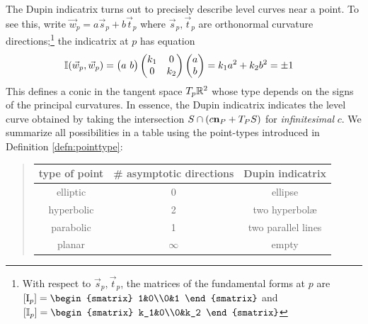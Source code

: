 The Dupin indicatrix turns out to precisely describe level curves near a point. To see this, write $\vec w_p=a\vec s_p+b\vec t_p$ where $\vec s_p,\vec t_p$ are orthonormal curvature directions;\footnote{With respect to $\vec s_p,\vec t_p$, the matrices of the fundamental forms at $p$ are $[\I_p]=\begin{smatrix}
1&0\\0&1
\end{smatrix}$ and $[\II_p]=\begin{smatrix}
k_1&0\\0&k_2
\end{smatrix}$} the indicatrix at $p$ has equation
\begin{align*}
	\mathbb{I}(\vec w_p,\vec w_p)&=\bigl(a\ b\bigr)
	\begin{pmatrix}
		k_1&0\\
		0&k_2
	\end{pmatrix}
	\begin{pmatrix}a\\b\end{pmatrix}
	=k_1a^2+k_2b^2=\pm 1
\end{align*}
This defines a conic in the tangent space $T_p\mathbb{R}^2$ whose type depends on the signs of the principal curvatures. In essence, the Dupin indicatrix indicates the level curve obtained by taking the intersection $S\cap (c{\mathbf{n}}_P+T_PS)$ for \emph{infinitesimal} $c$. We summarize all possibilities in a table using the point-types introduced in Definition \ref{defn:pointtype}:
\begin{quote}
	\begin{tabular}{c|c|c}
		type of point&\# asymptotic directions&Dupin indicatrix\\\hline
		elliptic&0&ellipse\\
		hyperbolic&2&two hyperbolæ\\
		parabolic&1&two parallel lines\\
		planar&$\infty$&empty
	\end{tabular}
\end{quote}


